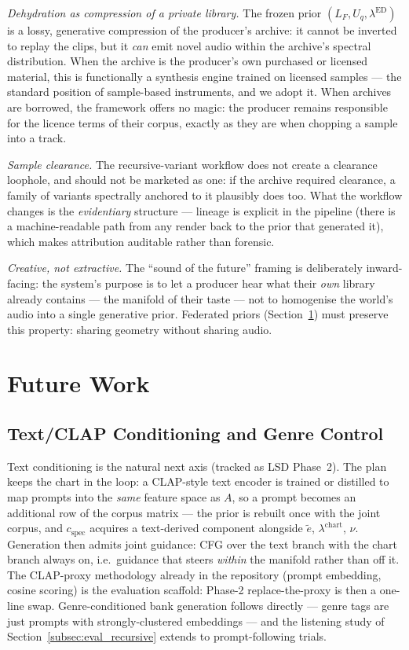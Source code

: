 \documentclass[12pt,a4paper]{article}
\begin{document}
\emph{Dehydration as compression of a private library.} The frozen
prior $(L_F, U_q, \lambda^{\mathrm{ED}})$ is a lossy, generative
compression of the producer's archive: it cannot be inverted to replay
the clips, but it \emph{can} emit novel audio within the archive's
spectral distribution. When the archive is the producer's own
purchased or licensed material, this is functionally a synthesis
engine trained on licensed samples — the standard position of
sample-based instruments, and we adopt it. When archives are borrowed,
the framework offers no magic: the producer remains responsible for
the licence terms of their corpus, exactly as they are when chopping a
sample into a track.

\emph{Sample clearance.} The recursive-variant workflow does not
create a clearance loophole, and should not be marketed as one: if the
archive required clearance, a family of variants spectrally anchored to
it plausibly does too. What the workflow changes is the
\emph{evidentiary} structure — lineage is explicit in the pipeline
(there is a machine-readable path from any render back to the prior
that generated it), which makes attribution auditable rather than
forensic.

\emph{Creative, not extractive.} The ``sound of the future'' framing
is deliberately inward-facing: the system's purpose is to let a
producer hear what their \emph{own} library already contains — the
manifold of their taste — not to homogenise the world's audio into a
single generative prior. Federated priors
(Section~\ref{sec:futurework}) must preserve this property: sharing
geometry without sharing audio.


\section{Future Work}
\label{sec:futurework}

\subsection{Text/CLAP Conditioning and Genre Control}

Text conditioning is the natural next axis (tracked as LSD Phase~2).
The plan keeps the chart in the loop: a CLAP-style text encoder is
trained or distilled to map prompts into the \emph{same} feature space
as $A$, so a prompt becomes an additional row of the corpus matrix —
the prior is rebuilt once with the joint corpus, and
$c_{\mathrm{spec}}$ acquires a text-derived component alongside
$\tilde{e}$, $\lambda^{\mathrm{chart}}$, $\nu$. Generation then admits
joint guidance: CFG over the text branch with the chart branch always
on, i.e.\ guidance that steers \emph{within} the manifold rather than
off it. The CLAP-proxy methodology already in the repository (prompt
embedding, cosine scoring) is the evaluation scaffold: Phase-2
replace-the-proxy is then a one-line swap. Genre-conditioned bank
generation follows directly — genre tags are just prompts with
strongly-clustered embeddings — and the listening study of
Section~\ref{subsec:eval_recursive} extends to prompt-following trials.
\end{document}
